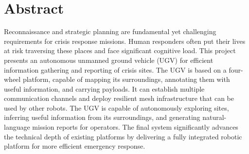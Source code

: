 \documentclass{thesis-report}
\begin{document}
\chapter*{Abstract}
Reconnaissance and strategic planning are fundamental yet challenging requirements for crisis response missions. Human responders often put their lives at risk traversing these places and face significant cognitive load. This project presents an autonomous unmanned ground vehicle (UGV) for efficient information gathering and reporting of crisis sites. The UGV is based on a four-wheel platform, capable of mapping its surroundings, annotating them with useful information, and carrying payloads. It can establish multiple communication channels and deploy resilient mesh infrastructure that can be used by other robots. The UGV is capable of autonomously exploring sites, inferring useful information from its surroundings, and generating natural-language mission reports for operators. The final system significantly advances the technical depth of existing platforms by delivering a fully integrated robotic platform for more efficient emergency response.
\cleardoublepage

\makeatletter
\let\ps@plain\ps@plain@saved
\makeatother
\pagestyle{plain}
\setcounter{page}{1}








\appendix
\renewcommand{\cleardoublepage}{\newpage}




\end{document}
